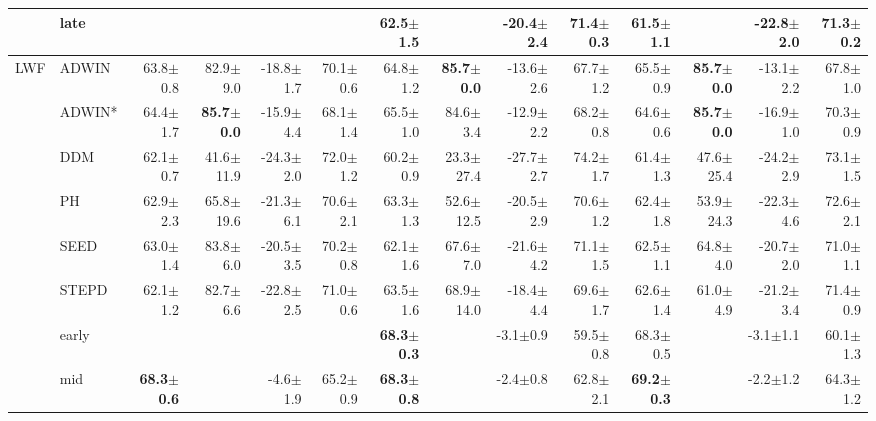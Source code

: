 \begin{tabular}{llrrrrrrrrrrrr}
 & late &  &  &  &  & 62.5\tiny{$\pm$1.5} &  & -20.4\tiny{$\pm$2.4} & 71.4\tiny{$\pm$0.3} & 61.5\tiny{$\pm$1.1} &  & -22.8\tiny{$\pm$2.0} & 71.3\tiny{$\pm$0.2} \\
\midrule
\multirow[t]{9}{*}{LWF} & ADWIN & 63.8\tiny{$\pm$0.8} & 82.9\tiny{$\pm$9.0} & -18.8\tiny{$\pm$1.7} & 70.1\tiny{$\pm$0.6} & 64.8\tiny{$\pm$1.2} & \textbf{85.7\tiny{$\pm$0.0}} & -13.6\tiny{$\pm$2.6} & 67.7\tiny{$\pm$1.2} & 65.5\tiny{$\pm$0.9} & \textbf{85.7\tiny{$\pm$0.0}} & -13.1\tiny{$\pm$2.2} & 67.8\tiny{$\pm$1.0} \\
 & ADWIN* & 64.4\tiny{$\pm$1.7} & \textbf{85.7\tiny{$\pm$0.0}} & -15.9\tiny{$\pm$4.4} & 68.1\tiny{$\pm$1.4} & 65.5\tiny{$\pm$1.0} & 84.6\tiny{$\pm$3.4} & -12.9\tiny{$\pm$2.2} & 68.2\tiny{$\pm$0.8} & 64.6\tiny{$\pm$0.6} & \textbf{85.7\tiny{$\pm$0.0}} & -16.9\tiny{$\pm$1.0} & 70.3\tiny{$\pm$0.9} \\
 & DDM & 62.1\tiny{$\pm$0.7} & 41.6\tiny{$\pm$11.9} & -24.3\tiny{$\pm$2.0} & 72.0\tiny{$\pm$1.2} & 60.2\tiny{$\pm$0.9} & 23.3\tiny{$\pm$27.4} & -27.7\tiny{$\pm$2.7} & 74.2\tiny{$\pm$1.7} & 61.4\tiny{$\pm$1.3} & 47.6\tiny{$\pm$25.4} & -24.2\tiny{$\pm$2.9} & 73.1\tiny{$\pm$1.5} \\
 & PH & 62.9\tiny{$\pm$2.3} & 65.8\tiny{$\pm$19.6} & -21.3\tiny{$\pm$6.1} & 70.6\tiny{$\pm$2.1} & 63.3\tiny{$\pm$1.3} & 52.6\tiny{$\pm$12.5} & -20.5\tiny{$\pm$2.9} & 70.6\tiny{$\pm$1.2} & 62.4\tiny{$\pm$1.8} & 53.9\tiny{$\pm$24.3} & -22.3\tiny{$\pm$4.6} & 72.6\tiny{$\pm$2.1} \\
 & SEED & 63.0\tiny{$\pm$1.4} & 83.8\tiny{$\pm$6.0} & -20.5\tiny{$\pm$3.5} & 70.2\tiny{$\pm$0.8} & 62.1\tiny{$\pm$1.6} & 67.6\tiny{$\pm$7.0} & -21.6\tiny{$\pm$4.2} & 71.1\tiny{$\pm$1.5} & 62.5\tiny{$\pm$1.1} & 64.8\tiny{$\pm$4.0} & -20.7\tiny{$\pm$2.0} & 71.0\tiny{$\pm$1.1} \\
 & STEPD & 62.1\tiny{$\pm$1.2} & 82.7\tiny{$\pm$6.6} & -22.8\tiny{$\pm$2.5} & 71.0\tiny{$\pm$0.6} & 63.5\tiny{$\pm$1.6} & 68.9\tiny{$\pm$14.0} & -18.4\tiny{$\pm$4.4} & 69.6\tiny{$\pm$1.7} & 62.6\tiny{$\pm$1.4} & 61.0\tiny{$\pm$4.9} & -21.2\tiny{$\pm$3.4} & 71.4\tiny{$\pm$0.9} \\
 & early &  &  &  &  & \textbf{68.3\tiny{$\pm$0.3}} &  & -3.1\tiny{$\pm$0.9} & 59.5\tiny{$\pm$0.8} & 68.3\tiny{$\pm$0.5} &  & -3.1\tiny{$\pm$1.1} & 60.1\tiny{$\pm$1.3} \\
 & mid & \textbf{68.3\tiny{$\pm$0.6}} &  & -4.6\tiny{$\pm$1.9} & 65.2\tiny{$\pm$0.9} & \textbf{68.3\tiny{$\pm$0.8}} &  & -2.4\tiny{$\pm$0.8} & 62.8\tiny{$\pm$2.1} & \textbf{69.2\tiny{$\pm$0.3}} &  & -2.2\tiny{$\pm$1.2} & 64.3\tiny{$\pm$1.2} \\

\end{tabular}
